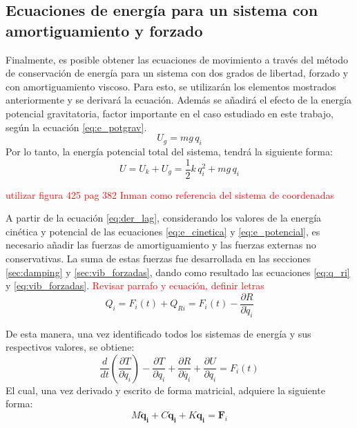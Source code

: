 \subsection{Ecuaciones de energía para un sistema con amortiguamiento y forzado}
Finalmente, es posible obtener las ecuaciones de movimiento a través del método de conservación de energía para un sistema con dos grados de libertad, forzado y con amortiguamiento viscoso. Para esto, se utilizarán los elementos mostrados anteriormente y se derivará la ecuación. Además se añadirá el efecto de la energía potencial gravitatoria, factor importante en el caso estudiado en este trabajo, según la ecuación \ref{eq:e_potgrav}. 
\begin{equation}\label{eq:e_potgrav}
	U_g = mg\,q_i
\end{equation}
Por lo tanto, la energía potencial total del sistema, tendrá la siguiente forma:
\begin{equation}\label{eq:e_potencial}
	U = U_k + U_g = \frac{1}{2}k\,q_i^2 + mg\,q_i
\end{equation}

\textcolor{red}{utilizar figura 425 pag 382 Inman como referencia del sistema de coordenadas}



A partir de la ecuación \ref{eq:der_lag}, considerando los valores de la energía cinética y potencial de las ecuaciones \ref{eq:e_cinetica} y \ref{eq:e_potencial}, es necesario añadir las fuerzas de amortiguamiento y las fuerzas externas no conservativas. La suma de estas fuerzas fue desarrollada en las secciones \ref{sec:damping} y \ref{sec:vib_forzadas}, dando como resultado las ecuaciones \ref{eq:q_ri} y \ref{eq:vib_forzadas}. \textcolor{red}{Revisar parrafo y ecuación, definir letras}
\begin{equation}
	Q_i = F_i(t) + Q_{Ri} = F_i(t) - \frac{\partial R}{\partial \dot{q}_i} 
\end{equation}

De esta manera, una vez identificado todos los sistemas de energía y sus respectivos valores, se obtiene:
\begin{equation}
	\frac{d}{dt}\left(\frac{\partial T}{\partial \dot{q}_i}\right) - \frac{\partial T}{\partial q_i} + \frac{\partial R}{\partial \dot{q_i}} + \frac{\partial U}{\partial q_i} = F_i(t)
\end{equation}
El cual, una vez derivado y escrito de forma matricial, adquiere la siguiente forma:
\begin{equation}
	\mathit{M}\mathbf{\ddot{q}_i} + \mathit{C}\mathbf{\dot{q}_i} + \mathit{K}\mathbf{q_i} = \mathbf{F}_i
\end{equation}